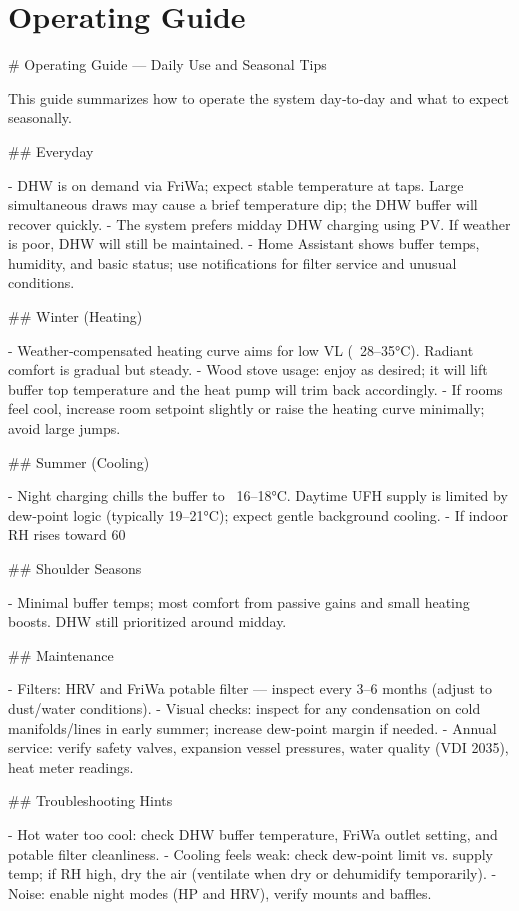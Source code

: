 \documentclass[11pt,oneside]{report}
\begin{document}
\chapter{Operating Guide}
\begin{markdown}
# Operating Guide — Daily Use and Seasonal Tips

This guide summarizes how to operate the system day‑to‑day and what to expect seasonally.

## Everyday

- DHW is on demand via FriWa; expect stable temperature at taps. Large simultaneous draws may cause a brief temperature dip; the DHW buffer will recover quickly.
- The system prefers midday DHW charging using PV. If weather is poor, DHW will still be maintained.
- Home Assistant shows buffer temps, humidity, and basic status; use notifications for filter service and unusual conditions.

## Winter (Heating)

- Weather‑compensated heating curve aims for low VL (~28–35°C). Radiant comfort is gradual but steady.
- Wood stove usage: enjoy as desired; it will lift buffer top temperature and the heat pump will trim back accordingly.
- If rooms feel cool, increase room setpoint slightly or raise the heating curve minimally; avoid large jumps.

## Summer (Cooling)

- Night charging chills the buffer to ~16–18°C. Daytime UFH supply is limited by dew‑point logic (typically 19–21°C); expect gentle background cooling.
- If indoor RH rises toward 60%

## Shoulder Seasons

- Minimal buffer temps; most comfort from passive gains and small heating boosts. DHW still prioritized around midday.

## Maintenance

- Filters: HRV and FriWa potable filter — inspect every 3–6 months (adjust to dust/water conditions).
- Visual checks: inspect for any condensation on cold manifolds/lines in early summer; increase dew‑point margin if needed.
- Annual service: verify safety valves, expansion vessel pressures, water quality (VDI 2035), heat meter readings.

## Troubleshooting Hints

- Hot water too cool: check DHW buffer temperature, FriWa outlet setting, and potable filter cleanliness.
- Cooling feels weak: check dew‑point limit vs. supply temp; if RH high, dry the air (ventilate when dry or dehumidify temporarily).
- Noise: enable night modes (HP and HRV), verify mounts and baffles.
\end{markdown}
\end{document}
